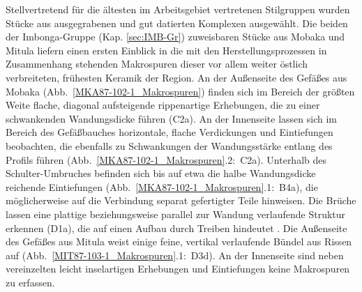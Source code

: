 \begin{multicols}{2}
Stellvertretend für die ältesten im Arbeitsgebiet vertretenen Stilgruppen wurden Stücke aus ausgegrabenen und gut datierten Komplexen ausgewählt. Die beiden der Imbonga-Gruppe (Kap. \ref{sec:IMB-Gr}) zuweisbaren Stücke aus Mobaka und Mitula liefern einen ersten Einblick in die mit den Herstellungsprozessen in Zusammenhang stehenden Makrospuren dieser vor allem weiter östlich verbreiteten, frühesten Keramik der Region. An der Außenseite des Gefäßes aus Mobaka (Abb.~\ref{MKA87-102-1_Makrospuren}) finden sich im Bereich der größten Weite flache, diagonal aufsteigende rippenartige Erhebungen, die zu einer schwankenden Wandungsdicke führen (C2a). An der Innenseite lassen sich im Bereich des Gefäßbauches horizontale, flache Verdickungen und Eintiefungen beobachten, die ebenfalls zu Schwankungen der Wandungsstärke entlang des Profils führen (Abb.~\ref{MKA87-102-1_Makrospuren}.2:~C2a). Unterhalb des Schulter-Umbruches befinden sich bis auf etwa die halbe Wandungsdicke reichende Eintiefungen (Abb.~\ref{MKA87-102-1_Makrospuren}.1:~B4a), die möglicherweise auf die Verbindung separat gefertigter Teile hinweisen. Die Brüche lassen eine plattige beziehungsweise parallel zur Wandung verlaufende Struktur erkennen (D1a), die auf einen Aufbau durch Treiben hindeutet \parencite[140 Abb. 8.c--d]{Lindahl.2010}. Die Außenseite des Gefäßes aus Mitula weist einige feine, vertikal verlaufende Bündel aus Rissen auf (Abb.~\ref{MIT87-103-1_Makrospuren}.1:~D3d). An der Innenseite sind neben vereinzelten leicht inselartigen Erhebungen und Eintiefungen keine Makrospuren zu erfassen. 


\end{multicols}
